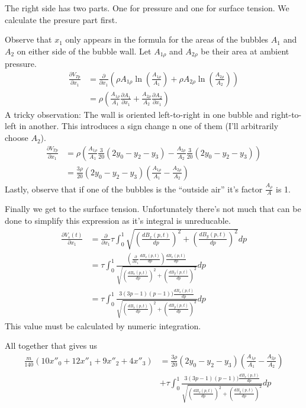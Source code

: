 \documentclass{article}
\begin{document}
The right side has two parts. One for pressure and one for surface tension. We
calculate the presure part first. 

Observe that $x_1$ only appears in the formula for the areas of the bubbles
$A_1$ and $A_2$ on either side of the bubble wall. Let $A_{1\rho}$ and
$A_{2\rho}$ be their area at ambient pressure. 
\begin{align*}
\frac{\partial V_{Tp}}{\partial x_1} &= \frac{\partial }{\partial x_1}
\left(
\rho A_{1\rho}
\ln\left(\frac{A_{1\rho}}{A_1}\right)
+\rho A_{2\rho}
\ln\left(\frac{A_{2\rho}}{A_2}\right)
\right)\\
&= 
\rho \left(
\frac{A_{1\rho}}{A_1} \frac{\partial A_1}{\partial x_1}
+\frac{A_{2\rho}}{A_2} \frac{\partial A_2}{\partial x_1}
\right)
\end{align*}
A tricky observation: The wall is oriented left-to-right in one bubble and
right-to-left in another. This introduces a sign change n one of them (I'll
arbitrarily choose $A_2$).
\begin{align*}
\frac{\partial V_{Tp}}{\partial x_1} &= 
\rho \left(
\frac{A_{1\rho}}{A_1} \frac{3}{20}(2y_0-y_2-y_3)
-\frac{A_{2\rho}}{A_2} \frac{3}{20}(2y_0-y_2-y_3)
\right)\\
&= 
 \frac{3\rho}{20} (2y_0-y_2-y_3)
\left( \frac{A_{1\rho}}{A_1} -\frac{A_{2\rho}}{A_2}\right)
\end{align*}
Lastly, observe that if one of the bubbles is the ``outside air'' it's factor
$\frac{A_{\rho}}{A}$ is 1.

Finally we get to the surface tension. Unfortunately there's not much that can
be done to simplify this expression as it's integral is unreducable.
\begin{align*}
\frac{\partial V_s(t)}{\partial x_1}&=
\frac{\partial}{\partial x_1}
\tau \int_0^1 \sqrt{\left(\frac{d B_x(p,t)}{dp}\right)^2+\left(\frac{d
B_y(p,t)}{dp}\right)^2} dp\\
&=
\tau\int_0^1\frac{\left(\frac{\partial}{\partial x_1}\frac{d
B_x(p,t)}{dp}\right) \frac{d B_x(p,t)}{dp}}{
  \sqrt{\left(\frac{d B_x(p,t)}{dp}\right)^2+\left(\frac{d
B_y(p,t)}{dp}\right)^2}} dp\\
&=
\tau\int_0^1\frac{3(3p-1)(p-1))  \frac{d B_x(p,t)}{dp}}{
  \sqrt{\left(\frac{d B_x(p,t)}{dp}\right)^2+\left(\frac{d
B_y(p,t)}{dp}\right)^2}} dp
\end{align*}
This value must be calculated by numeric integration.

All together that gives us
\begin{align*}
\frac{m}{140} \left(10x''_0+12x''_1+9x''_2+4x''_3 \right) &= 
 \frac{3\rho}{20} (2y_0-y_2-y_3)
\left( \frac{A_{1\rho}}{A_1} -\frac{A_{2\rho}}{A_2}\right)\\
&+\tau\int_0^1\frac{3(3p-1)(p-1))  \frac{d B_x(p,t)}{dp}}{
  \sqrt{\left(\frac{d B_x(p,t)}{dp}\right)^2+\left(\frac{d
B_y(p,t)}{dp}\right)^2}} dp
\end{align*}
\end{document}
